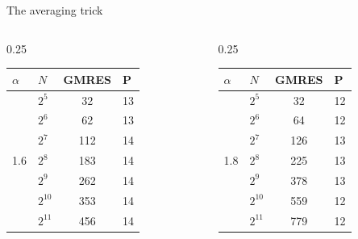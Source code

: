\documentclass[aspectratio=169,xcolor=dvipsnames]{beamer}
\begin{document}
\begin{frame}[fragile]{The averaging trick}
{\begin{columns}
\begin{column}{0.25\columnwidth}
\begin{tabular}{llcl}
\toprule
$\alpha$ & $N$ & GMRES & P \\
\midrule
\multirow{7}{*}{1.6} & $2^{5}$ & 32 & 13 \\
& $2^{6}$ & 62 & 13 \\
& $2^{7}$ & 112 & 14 \\
& $2^{8}$ & 183 & 14 \\
& $2^{9}$ & 262 & 14 \\
& $2^{10}$ & 353 & 14 \\
& $2^{11}$ & 456 & 14 \\
\bottomrule
\end{tabular}
\end{column}

\begin{column}{0.25\columnwidth}
\begin{tabular}{llcl}
\toprule
$\alpha$ & $N$ & GMRES & P \\
\midrule
\multirow{7}{*}{1.8} & $2^{5}$ & 32 & 12 \\
& $2^{6}$ & 64 & 12 \\
& $2^{7}$ & 126 & 13 \\
& $2^{8}$ & 225 & 13 \\
& $2^{9}$ & 378 & 13 \\
& $2^{10}$ & 559 & 12 \\
& $2^{11}$ & 779 & 12 \\
\bottomrule
\end{tabular}
		\end{column}
		
\end{columns}}

	\end{frame}
\end{document}
